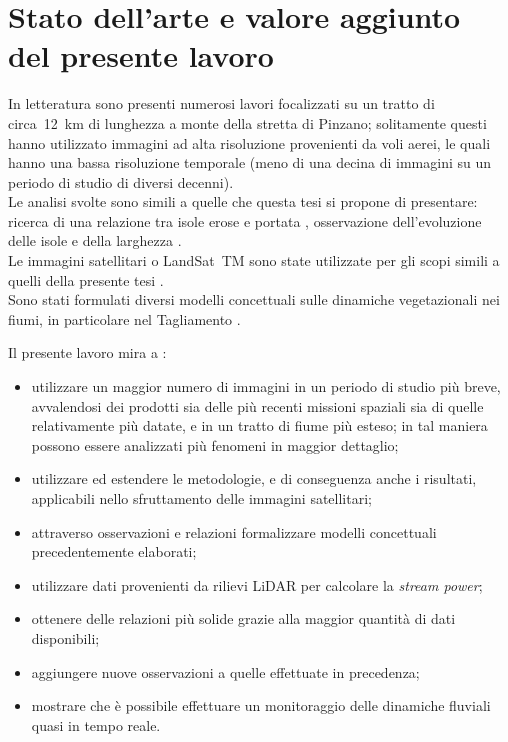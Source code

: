 \section{Stato dell'arte e valore aggiunto del presente lavoro}
In letteratura sono presenti numerosi lavori focalizzati su un tratto di circa~\SI{12}{\kilo\m} di lunghezza a monte della stretta di Pinzano; solitamente questi hanno utilizzato immagini ad alta risoluzione provenienti da voli aerei, le quali hanno una bassa risoluzione temporale (meno di una decina di immagini su un periodo di studio di diversi decenni).
\\
Le analisi svolte sono simili a quelle che questa tesi si propone di presentare: ricerca di una relazione tra isole erose e portata , osservazione dell'evoluzione delle isole e della larghezza .
\\
Le immagini satellitari \AST{} o LandSat~TM sono state utilizzate per gli scopi simili a quelli della presente tesi .
\\
Sono stati formulati diversi modelli concettuali sulle dinamiche vegetazionali nei fiumi, in particolare nel Tagliamento .


Il presente lavoro mira a :
\begin{itemize}
	\item utilizzare un maggior numero di immagini in un periodo di studio più breve, avvalendosi dei prodotti sia delle più recenti missioni spaziali sia di quelle relativamente più datate, e in un tratto di fiume più esteso; in tal maniera possono essere analizzati più fenomeni in maggior dettaglio;
	\item utilizzare ed estendere le metodologie, e di conseguenza anche i risultati, applicabili nello sfruttamento delle immagini satellitari;
	\item attraverso osservazioni e relazioni formalizzare modelli concettuali precedentemente elaborati;
	\item utilizzare dati provenienti da rilievi LiDAR per calcolare la \emph{stream power};
	\item ottenere delle relazioni più solide grazie alla maggior quantità di dati disponibili;
	\item aggiungere nuove osservazioni a quelle effettuate in precedenza;
	\item mostrare che è possibile effettuare un monitoraggio delle dinamiche fluviali quasi in tempo reale. 
\end{itemize}



